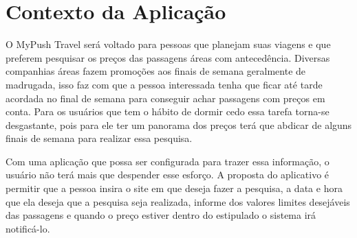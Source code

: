\chapter[Contexto da Aplicação]{Contexto da Aplicação}

O MyPush Travel será voltado para pessoas que planejam suas viagens e que preferem pesquisar os preços das passagens áreas com antecedência. Diversas companhias áreas fazem promoções aos finais de semana geralmente de madrugada, isso faz com que a pessoa interessada tenha que ficar até tarde acordada no final de semana para conseguir achar passagens com preços em conta. Para os usuários que tem o hábito de dormir cedo essa tarefa torna-se desgastante, pois para ele ter um panorama dos preços terá que abdicar de alguns finais de semana para realizar essa pesquisa. 

Com uma aplicação que possa ser configurada para trazer essa informação, o usuário não terá mais que  despender esse esforço. A proposta do aplicativo é permitir que a pessoa insira o site em que deseja fazer a pesquisa, a data e hora que ela deseja que a pesquisa seja realizada, informe dos valores limites desejáveis das passagens e quando o preço estiver dentro do estipulado o sistema irá notificá-lo. 
